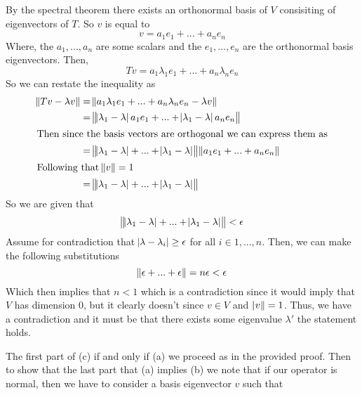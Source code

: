 \documentclass[10pt, twocolumn]{article}
\begin{document}
\begin{q}[12]
    By the spectral theorem there exists an orthonormal basis of $ V $ consisiting of eigenvectors of $ T $.
    So $ v $ is equal to 
    $$ v = a_1 e_1 + ... + a_n e_n $$ 
    Where, the $ a_1, ..., a_n $ are some scalars and the $ e_1, ..., e_n $ are the orthonormal basis eigenvectors.
    Then, 
    $$ Tv = a_1 \lambda_1 e_1 + ... + a_n \lambda_n e_n $$ 
    So we can restate the inequality as 
    \begin{align*}
    \norm{Tv - \lambda v}  &= \norm{a_1 \lambda_1 e_1 + ... + a_n \lambda_n e_n - \lambda v} \\
    &= \norm{ \abs{\lambda_1 - \lambda} a_1 e_1 + ... + \abs{\lambda_1 - \lambda} a_n e_n} \\
    \intertext{Then since the basis vectors are orthogonal we can express them as}
    &= \norm{\abs{\lambda_1 - \lambda} + ... + \abs{\lambda_1 - \lambda}}\norm{a_1 e_1 + ... + a_n e_n} \\
    \intertext{Following that $ \norm{v} = 1 $}
    &= \norm{\abs{\lambda_1 - \lambda} + ... + \abs{\lambda_1 - \lambda}} \\
    \end{align*}
    So we are given that 
    $$ \norm{\abs{\lambda_1 - \lambda} + ... + \abs{\lambda_1 - \lambda}} < \epsilon $$
    Assume for contradiction that $ \abs{\lambda - \lambda_i} \geq \epsilon $ for all $ i \in 1, ..., n $.
    Then, we can make the following substitutions
    $$ \norm{\epsilon + ... + \epsilon} = n \epsilon < \epsilon $$ 
    Which then implies that $ n < 1 $ which is a contradiction since it would imply that $ V $ has dimension 0, but it clearly doesn't since $ v \in V $ and $ \norm{v} = 1 $.
    Thus, we have a contradiction and it must be that there exists some eigenvalue $ \lambda' $ the statement holds.
\end{q}

\begin{q}[13]
    The first part of (c) if and only if (a) we proceed as in the provided proof. 
    Then to show that the last part that (a) implies (b) we note that if our operator is normal, 
    then we have to consider a basis eigenvector $ v $ such that
\end{q}
\end{document}
